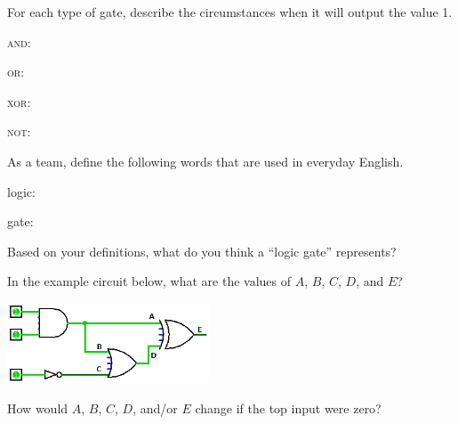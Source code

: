 \begin{answer}
\end{answer}


\Q For each type of gate, describe the circumstances when it will output the value 1.

\begin{description}
\item \textsc{and}:
\item \textsc{or}:
\item \textsc{xor}:
\item \textsc{not}:
\end{description}


\Q As a team, define the following words that are used in everyday English.

\begin{description}
\item logic:
\item gate:
\end{description}


\Q Based on your definitions, what do you think a ``logic gate'' represents?

\begin{answer}
\end{answer}


\Q In the example circuit below, what are the values of $A$, $B$, $C$, $D$, and $E$?

\vspace{1em}
\includegraphics[width=0.45\textwidth]{CSP/logic-example.png}
\vspace{1em}


\Q How would $A$, $B$, $C$, $D$, and/or $E$ change if the top input were zero?

\begin{answer}
\end{answer}
